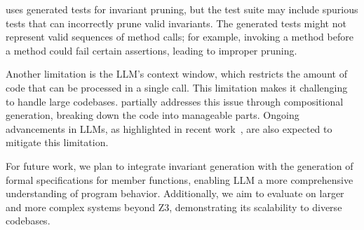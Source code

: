 
\tech uses generated tests for invariant pruning, but the test suite may include spurious tests that can incorrectly prune valid invariants. The generated tests might not represent valid sequences of method calls; for example, invoking a  method before a  method could fail certain assertions, leading to improper pruning.

Another limitation is the LLM's context window, which restricts the amount of code that can be processed in a single call. This limitation makes it challenging to handle large codebases. \tech partially addresses this issue through compositional generation, breaking down the code into manageable parts. Ongoing advancements in LLMs, as highlighted in recent work~\cite{liu2024lost,gao2023retrieval}, are also expected to mitigate this limitation.

For future work, we plan to integrate invariant generation with the generation of formal specifications for member functions, enabling LLM a more comprehensive understanding of program behavior. Additionally, we aim to evaluate \tech on larger and more complex systems beyond Z3, demonstrating its scalability to diverse codebases.





